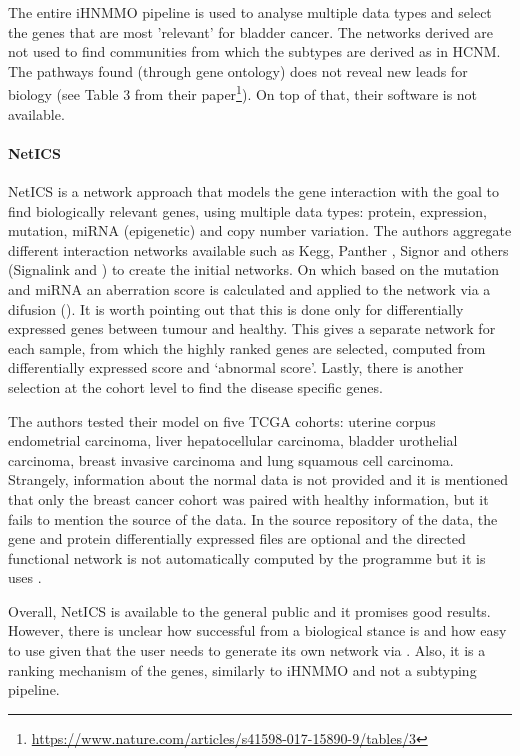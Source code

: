 The entire iHNMMO pipeline is used to analyse multiple data types and select the genes that are most 'relevant' for bladder cancer. The networks derived are not used to find communities from which the subtypes are derived as in HCNM\cite{Vangimalla2021-fc, Care2019-ij}. The pathways found (through gene ontology) does not reveal new leads for biology (see Table 3 from their paper\footnote{\url{https://www.nature.com/articles/s41598-017-15890-9/tables/3}}). On top of that, their software is not available.

\paragraph*{NetICS} \label{s:lit:netICS}

NetICS \citet{Dimitrakopoulos2018-br} is a network approach that models the gene interaction with the goal to find biologically relevant genes, using multiple data types: protein, expression, mutation, miRNA (epigenetic) and copy number variation. The authors aggregate different interaction networks available such as Kegg\cite{Kanehisa2017-wj}, Panther \cite{Thomas2022-kn}, Signor \cite{Perfetto2016-tw} and others (Signalink\cite{Fazekas2013-qh} and \citet{Wu2010-ap}) to create the initial networks. On which based on the mutation and miRNA an aberration score is calculated and applied to the network via a difusion (\cite{Leiserson2015-kv}). It is worth pointing out that this is done only for differentially expressed genes between tumour and healthy. This gives a separate network for each sample, from which the highly ranked genes are selected, computed from differentially expressed score and ‘abnormal score’. Lastly, there is another selection at the cohort level to find the disease specific genes.

The authors tested their model on five TCGA cohorts: uterine corpus endometrial carcinoma, liver hepatocellular carcinoma, bladder urothelial carcinoma, breast invasive carcinoma and lung squamous cell carcinoma. Strangely, information about the normal data is not provided and it is mentioned that only the breast cancer cohort was paired with healthy information, but it fails to mention the source of the data. In the source repository of the data, the gene and protein differentially expressed files are optional and the directed functional network is not automatically computed by the programme but it is uses \citet{Wu2010-ap}.

Overall, NetICS is available to the general public and it promises good results. However, there is unclear how successful from a biological stance is and how easy to use given that the user needs to generate its own network via \citet{Wu2010-ap}. Also, it is a ranking mechanism of the genes, similarly to iHNMMO and not a subtyping pipeline.



